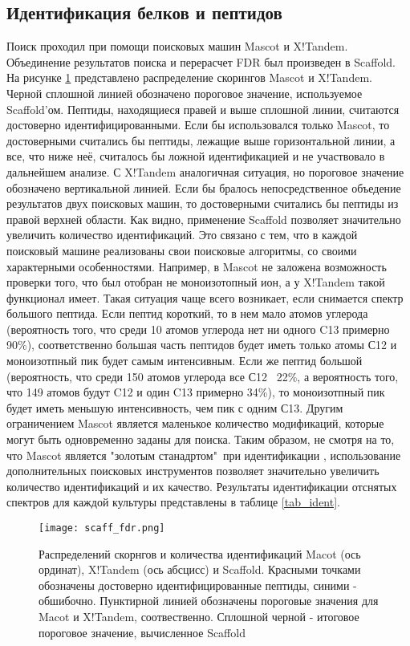 \subsection{Идентификация белков и пептидов}
Поиск проходил при помощи поисковых машин Mascot и X!Tandem. Объединение результатов поиска и перерасчет FDR был произведен в Scaffold. На рисунке \ref{scaff_fdr} представлено распределение скорингов Mascot и X!Tandem. Черной сплошной линией обозначено пороговое значение, используемое Scaffold'ом. Пептиды, находящиеся правей и выше сплошной линии, считаются достоверно идентифицированными. Если бы использовался только Mascot, то достоверными считались бы пептиды, лежащие выше горизонтальной линии, а все, что ниже неё, считалось бы ложной идентификацией и не участвовало в дальнейшем анализе. С X!Tandem аналогичная ситуация, но пороговое значение обозначено вертикальной линией. Если бы бралось непосредственное объедение результатов двух поисковых машин, то достоверными считались бы пептиды из правой верхней области. Как видно, применение Scaffold позволяет значительно увеличить количество идентификаций. Это связано с тем, что в каждой поисковый машине реализованы свои поисковые алгоритмы, со своими характерными особенностями. Например, в Mascot не заложена возможность проверки того, что был отобран не моноизотопный ион, а у X!Tandem такой функционал имеет. Такая ситуация чаще всего возникает, если снимается спектр большого пептида. Если пептид короткий, то в нем мало атомов углерода (вероятность того, что среди 10 атомов углерода нет ни одного C13 примерно 90\%), соответственно большая часть пептидов будет иметь только атомы С12 и моноизотпный пик будет самым интенсивным. Если же пептид большой (вероятность, что среди 150 атомов углерода все С12 ~22\%, а вероятность того, что 149 атомов будут C12 и один C13 примерно 34\%), то моноизотпный пик будет иметь меньшую интенсивность, чем пик с одним С13. Другим ограничением Mascot является маленькое количество модификаций, которые могут быть одновременно заданы для поиска. Таким образом, не смотря на то, что Mascot является "золотым станадртом"\ при идентификации \cite{cox2011andromeda}, использование дополнительных поисковых инструментов позволяет значительно увеличить количество идентификаций и их качество. Результаты идентификации отснятых спектров для каждой культуры представлены в таблице \ref{tab_ident}.


\begin{figure}[h!]
    \begin{center}
        \texttt{[image: scaff\_fdr.png]}
    \end{center}
\caption[foo bar]{Распределений скорнгов и количества идентификаций Macot (ось ординат), X!Tandem (ось абсцисс) и Scaffold. Красными точками обозначены достоверно идентифицированные пептиды, синими - обшибочно. Пунктирной линией обозначены пороговые значения для Macot и X!Tandem, соотвественно. Сплошной черной - итоговое пороговое значение, вычисленное Scaffold}
\label{scaff_fdr}
\end{figure}


